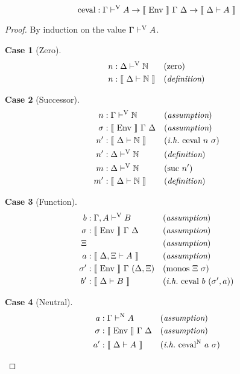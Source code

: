 \documentclass{llncs}
\newtheorem{scase}{Case}
\def\marr{\rightarrow}
\def\nat{\mathbb{N}}
\def\zero{\con{zero}}
\def\suc{\con{suc}}
\def\monos{\fun{monos}}
\def\cevalv{\fun{ceval}}
\def\cevaln{\fun{ceval}^\con{N}}
\def\bydef{(\textit{definition})}
\def\byass{(\textit{assumption})}
\newcommand{\ih}[1]{(\textit{i.h.}~ #1)}
\newcommand{\by}[1]{(#1)}
\newcommand{\turn}[1]{\vdash^\con{#1}}
\newcommand{\el}[1]{\llbracket ~ #1 ~ \rrbracket}
\newcommand{\con}[1]{\textmd{#1}}
\newcommand{\fun}[1]{\textmd{#1}}
\newcommand{\dtypm}[1]{\el{\Delta \vdash #1}}
\newcommand{\typv}[1]{\Gamma \turn{V} #1}
\newcommand{\dtypv}[1]{\Delta \turn{V} #1}
\newcommand{\gatypv}[1]{\Gamma, A \turn{V} #1}
\newcommand{\typn}[1]{\Gamma \turn{N} #1}
\def\menv{\el{\fun{Env}}~\Gamma~\Delta}
\newcommand{\gmenv}[1]{\el{\fun{Env}}~\Gamma~#1}
\begin{document}
\begin{theorem}
\label{thm:mod:cevalv}
$$
\cevalv : \typv{A} \marr \menv \marr \dtypm{A}
$$
\end{theorem}

\begin{proof}

By induction on the value $\typv{A}$.

\begin{scase}[Zero]
\begin{align*}
n  &: \dtypv{\nat} && \by{\zero}\\
n  &: \dtypm{\nat} && \bydef
\end{align*}
\end{scase}

\begin{scase}[Successor]
\begin{align*}
n   &: \typv{\nat} && \byass\\
\sigma  &: \menv && \byass\\
n'  &: \dtypm{\nat} && \ih{\cevalv~n~\sigma}\\
n'  &: \dtypv{\nat} && \bydef\\
m   &: \dtypv{\nat} && \by{\suc~n'}\\
m'  &: \dtypm{\nat} && \bydef
\end{align*}
\end{scase}

\begin{scase}[Function]
\begin{align*}
b   &: \gatypv{B} && \byass\\
\sigma  &: \menv && \byass\\
\Xi& && \byass\\
a   &: \el{\Delta, \Xi \vdash A} && \byass\\
\sigma'  &: \gmenv{(\Delta, \Xi)} && \by{\monos~\Xi~\sigma}\\
b'  &: \dtypm{B} && \ih{\cevalv~b~(\sigma', a)}\\
\end{align*}
\end{scase}

\begin{scase}[Neutral]
\begin{align*}
a   &: \typn{A} && \byass\\
\sigma  &: \menv && \byass\\
a'  &: \dtypm{A} && \ih{\cevaln~a~\sigma}
\end{align*}
\end{scase}


\end{proof}
\end{document}

